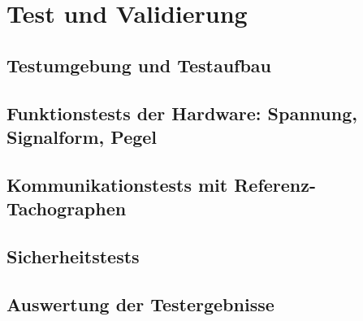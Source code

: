 \chapter{Test und Validierung}
\section{Testumgebung und Testaufbau}

\section{Funktionstests der Hardware: Spannung, Signalform, Pegel}

\section{Kommunikationstests mit Referenz-Tachographen}

\section{Sicherheitstests}

\section{Auswertung der Testergebnisse}
